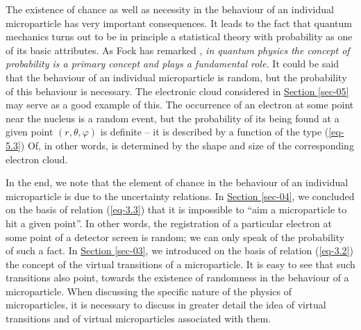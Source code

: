 \documentclass[a4paper,sfsidenotes,colorlinks=true]{tufte-book}
\numberwithin{equation}{section}
\numberwithin{figure}{section}
\begin{document}
The existence of chance as well as necessity in the behaviour of an
individual microparticle has very important consequences. It leads to
the fact that quantum mechanics turns out to be in principle a
statistical theory with probability as one of its basic attributes. As
Fock has remarked \cite{fock-1957}, \emph{in quantum physics the
  concept of probability is a primary concept and plays a fundamental
  role.} It could be said that the behaviour of an individual
microparticle is random, but the probability of this behaviour is
necessary. The electronic cloud considered in
\hyperref[sec-05]{Section \ref{sec-05}} may serve as a good example of
this. The occurrence of an electron at some point near the nucleus is
a random event, but the probability of its being found at a given
point $(r, \theta, \varphi)$ is definite -- it is described by a
function of the type (\ref{eq-5.3}) Of, in other words, is determined
by the shape and size of the corresponding electron cloud.

In the end, we note that the element of chance in the behaviour of an
individual microparticle is due to the uncertainty relations. In
\hyperref[sec-04]{Section \ref{sec-04}}, we concluded on the basis of
relation (\ref{eq-3.3}) that it is impossible to ``aim a microparticle
to hit a given point''. In other words, the registration of a
particular electron at some point of a detector screen is random; we
can only speak of the probability of such a fact. In
\hyperref[sec-03]{Section \ref{sec-03}}, we introduced on the basis of
relation (\ref{eq-3.2}) the concept of the virtual transitions of a
microparticle. It is easy to see that such transitions also point,
towards the existence of randomness in the behaviour of a
microparticle. When discussing the specific nature of the physics of
microparticles, it is necessary to discuss in greater detail the idea
of virtual transitions and of virtual microparticles associated with
them.
\end{document}
